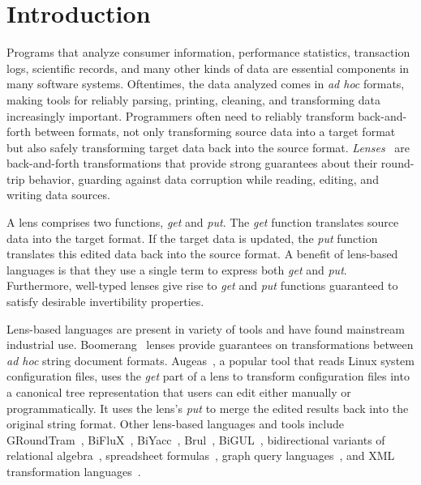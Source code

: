 \documentclass[sigplan,acmsmall]{acmart}
\begin{document}
\section{Introduction}

Programs that analyze consumer information, performance statistics, transaction
logs, scientific records, and many other kinds of data are essential components
in many software systems.
Oftentimes, the data analyzed comes in \emph{ad hoc} formats, making
tools for reliably parsing, printing, cleaning, and transforming data
increasingly important.
Programmers often need to reliably transform back-and-forth between
formats, not only transforming source data into a target
format but also safely transforming target data back into the source format.
\emph{Lenses}~\cite{Focal2005-long} are back-and-forth
transformations that provide strong guarantees about their round-trip behavior,
guarding against data corruption
while reading, editing, and writing data sources.  

A lens comprises two functions,
\emph{get} and \emph{put}.  The \emph{get} function translates
source data into the target format.  If the target data is updated, the
\emph{put} function translates this edited data back into the
source format.  
A benefit of lens-based languages is that they use a single term
to express both 
\emph{get} and \emph{put}.
Furthermore, well-typed lenses give rise to 
\emph{get} and \emph{put} functions 
guaranteed to satisfy desirable invertibility properties.

Lens-based languages are present in variety of tools and have found mainstream
industrial use.
Boomerang~\cite{boomerang, Matching10} lenses provide
guarantees on transformations between {\em ad hoc} string document formats.
Augeas~\cite{augeas}, a popular tool that reads Linux system configuration
files, uses the \emph{get} part of a lens to transform configuration
files into a canonical tree representation that users can edit
either manually or 
programmatically.  It uses the lens's \emph{put} to merge the edited
results back into the original string format.  Other lens-based languages and
tools include 
%
GRoundTram~\cite{Hidaka2011GRoundTramAI},
%
BiFluX~\cite{DBLP:conf/ppdp/PachecoZH14}, 
%
BiYacc~\cite{DBLP:conf/staf/ZhuK0SH15},
%
Brul~\cite{DBLP:conf/etaps/ZanLKH16},
%
BiGUL~\cite{DBLP:conf/pepm/KoZH16}, 
%
bidirectional variants of 
relational algebra~\cite{BohannonPierceVaughan},
spreadsheet formulas~\cite{DBLP:conf/vl/MacedoPSC14},
graph query languages~\cite{DBLP:conf/icfp/HidakaHIKMN10},
and
XML transformation languages~\cite{DBLP:conf/pepm/LiuHT07}.
%
\end{document}
